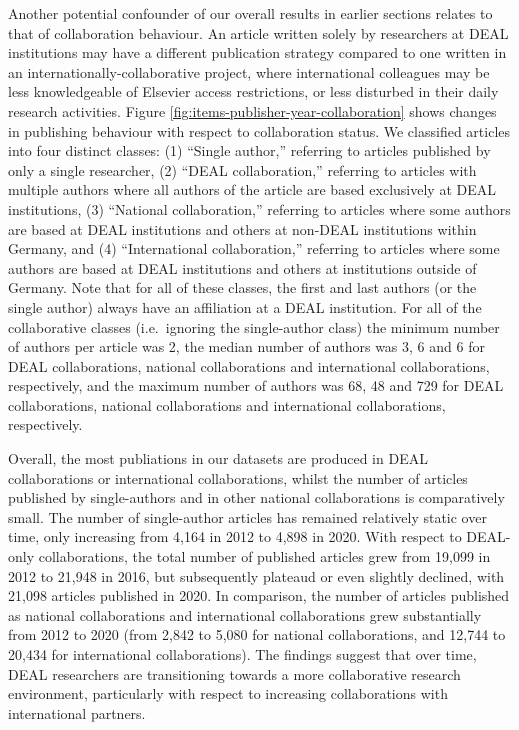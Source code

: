 \documentclass[
]{article}
\begin{document}
Another potential confounder of our overall results in earlier sections relates to that of collaboration behaviour. An article written solely by researchers at DEAL institutions may have a different publication strategy compared to one written in an internationally-collaborative project, where international colleagues may be less knowledgeable of Elsevier access restrictions, or less disturbed in their daily research activities. Figure \ref{fig:items-publisher-year-collaboration} shows changes in publishing behaviour with respect to collaboration status. We classified articles into four distinct classes: (1) ``Single author,'' referring to articles published by only a single researcher, (2) ``DEAL collaboration,'' referring to articles with multiple authors where all authors of the article are based exclusively at DEAL institutions, (3) ``National collaboration,'' referring to articles where some authors are based at DEAL institutions and others at non-DEAL institutions within Germany, and (4) ``International collaboration,'' referring to articles where some authors are based at DEAL institutions and others at institutions outside of Germany. Note that for all of these classes, the first and last authors (or the single author) always have an affiliation at a DEAL institution. For all of the collaborative classes (i.e.~ignoring the single-author class) the minimum number of authors per article was 2, the median number of authors was 3, 6 and 6 for DEAL collaborations, national collaborations and international collaborations, respectively, and the maximum number of authors was 68, 48 and 729 for DEAL collaborations, national collaborations and international collaborations, respectively.

Overall, the most publiations in our datasets are produced in DEAL collaborations or international collaborations, whilst the number of articles published by single-authors and in other national collaborations is comparatively small. The number of single-author articles has remained relatively static over time, only increasing from 4,164 in 2012 to 4,898 in 2020. With respect to DEAL-only collaborations, the total number of published articles grew from 19,099 in 2012 to 21,948 in 2016, but subsequently plateaud or even slightly declined, with 21,098 articles published in 2020. In comparison, the number of articles published as national collaborations and international collaborations grew substantially from 2012 to 2020 (from 2,842 to 5,080 for national collaborations, and 12,744 to 20,434 for international collaborations). The findings suggest that over time, DEAL researchers are transitioning towards a more collaborative research environment, particularly with respect to increasing collaborations with international partners.
\end{document}

